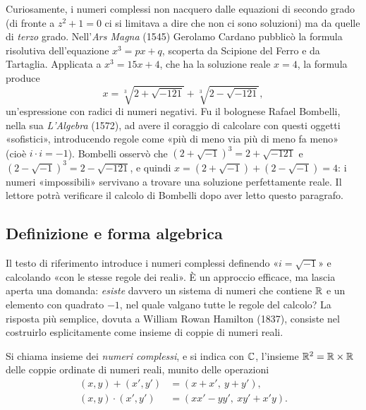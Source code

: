 \begin{notastorica}
Curiosamente, i numeri complessi non nacquero dalle equazioni di secondo grado (di fronte
a $z^{2}+1=0$ ci si limitava a dire che non ci sono soluzioni) ma da quelle di
\emph{terzo} grado. Nell'\emph{Ars Magna} (1545) Gerolamo Cardano pubblicò la formula
risolutiva dell'equazione $x^{3}=px+q$, scoperta da Scipione del Ferro e da Tartaglia.
Applicata a $x^{3}=15x+4$, che ha la soluzione reale $x=4$, la formula produce
\[
  x=\sqrt[3]{2+\sqrt{-121}}+\sqrt[3]{2-\sqrt{-121}},
\]
un'espressione con radici di numeri negativi. Fu il bolognese Rafael Bombelli, nella sua
\emph{L'Algebra} (1572), ad avere il coraggio di calcolare con questi oggetti
«sofistici», introducendo regole come «più di meno via più di meno fa meno» (cioè
$i\cdot i=-1$). Bombelli osservò che $(2+\sqrt{-1})^{3}=2+\sqrt{-121}$ e
$(2-\sqrt{-1})^{3}=2-\sqrt{-121}$, e quindi
$x=(2+\sqrt{-1})+(2-\sqrt{-1})=4$: i numeri «impossibili» servivano a trovare una
soluzione perfettamente reale. Il lettore potrà verificare il calcolo di Bombelli dopo
aver letto questo paragrafo.
\end{notastorica}

\subsection{Definizione e forma algebrica}

Il testo di riferimento \cite{marcellini-sbordone} introduce i numeri complessi
definendo «$i=\sqrt{-1}$» e calcolando «con le stesse regole dei reali». È un approccio
efficace, ma lascia aperta una domanda: \emph{esiste} davvero un sistema di numeri che
contiene $\mathbb{R}$ e un elemento con quadrato $-1$, nel quale valgano tutte le regole del
calcolo? La risposta più semplice, dovuta a William Rowan Hamilton (1837), consiste nel
costruirlo esplicitamente come insieme di coppie di numeri reali.

\begin{definizione}
Si chiama insieme dei \emph{numeri complessi}, e si indica con $\mathbb{C}$, l'insieme
$\mathbb{R}^{2}=\mathbb{R}\times\mathbb{R}$ delle coppie ordinate di numeri reali, munito delle operazioni
\begin{align}
  (x,y)+(x',y')&=(x+x',\ y+y'), \label{eq:somma-complessi}\\
  (x,y)\cdot(x',y')&=(xx'-yy',\ xy'+x'y). \label{eq:prodotto-complessi}
\end{align}
\end{definizione}

